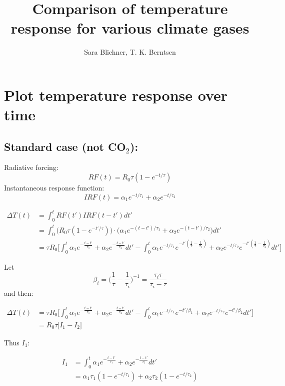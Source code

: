 \documentclass[11pt]{article}
\title{Comparison of temperature response for various climate gases}
\author{Sara Blichner, T. K. Berntsen}
\begin{document}
    
    \maketitle
    
    

    
    \hypertarget{plot-temperature-response-over-time}{%
\section{Plot temperature response over
time}\label{plot-temperature-response-over-time}}

    \hypertarget{standard-case-not-co_2}{%
\subsection{\texorpdfstring{Standard case (not
CO\(_2\)):}{Standard case (not CO\_2):}}\label{standard-case-not-co_2}}

Radiative forcing: \[
RF(t) = R_0 \tau (1-e^{-t/\tau})
\] Instantaneous response function: \[
IRF(t) = \alpha_1 e^{-t/\tau_1}+\alpha_2 e^{-t/\tau_2}
\]

    \begin{align*} \Delta T (t) &= \int_0^t RF(t') IRF(t-t') dt' \\ &= \int_0^t \Big(R_0 \tau (1-e^{-t'/\tau})\Big)
\cdot \Big( \alpha_1 e^{-(t-t')/\tau_1}+\alpha_2 e^{-(t-t')/\tau_2}\Big) dt'\\ &= \tau R_0 \Big[ \int_0^t \alpha_1
e^{-\frac{t-t'}{\tau_1}}+\alpha_2 e^{-\frac{t-t'}{\tau_2}} dt' - \int_0^t \alpha_1 e^{-t/\tau_1}e^{-t' (\frac{1}{
\tau}-\frac{1}{\tau_1})} + \alpha_2e^{-t/\tau_2}  e^{-t' (\frac{1}{\tau}-\frac{1}{\tau_2})} dt' \Big] \end{align*}

Let
\[\beta_i = \Big(\frac{1}{\tau}-\frac{1}{\tau_i}\Big)^{-1} = \frac{\tau_i\tau}{\tau_i -\tau}\]
and then:

    \begin{align*} 
\Delta T (t) &= \tau R_0 \Big[ \int_0^t \alpha_1 e^{-\frac{t-t'}{\tau_1}}+\alpha_2 e^{-\frac{t-t'}{\tau_2}} dt' -\int_0^t \alpha_1 e^{-t/\tau_1}e^{-t'/\beta_1} + \alpha_2e^{-t/\tau_2}  e^{-t'/\beta_2} dt'\Big]\\
& = R_0\tau \Big[ I_1 - I_2 \Big]
\end{align*}

    Thus \(I_1\):

    \begin{align*} 
I_1 & =  \int_0^t \alpha_1 e^{-\frac{t-t'}{\tau_1}}+\alpha_2 e^{-\frac{t-t'}{\tau_2}} dt' \\
&= \alpha_1\tau_1(1-e^{-t/\tau_1}) + \alpha_2 \tau_2(1 - e^{-t/\tau_2})
\end{align*}
\end{document}
